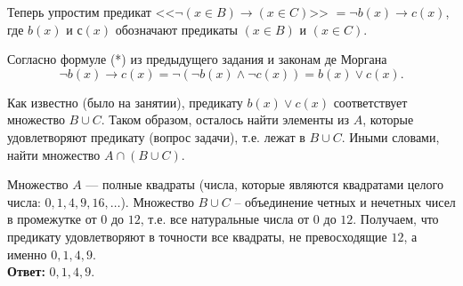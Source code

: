 \documentclass[a4paper,12pt]{article}
\begin{document}
Теперь упростим предикат <<$\neg (x \in B) \rightarrow (x \in C)$>> $=\neg b(x)\rightarrow c(x)$, где $b(x)$ и $с(x)$ обозначают предикаты $(x \in B)$ и $(x \in C)$.

Согласно формуле (*) из предыдущего задания и законам де Моргана $$\neg b(x)\rightarrow c(x)=\neg \left(\neg b(x) \wedge \neg c(x)\right)= b(x) \vee  c(x).$$

Как известно (было на занятии), предикату $b(x) \vee  c(x)$ соответствует множество $B\cup C$. Таком образом, осталось найти элементы из $A$, которые удовлетворяют предикату (вопрос задачи), т.е. лежат в $B\cup C$. Иными словами, найти множество $A\cap (B\cup C)$. 

Множество $A$ --- полные квадраты (числа, которые являются квадратами целого числа: $0,1,4,9,16,\ldots $). Множество $B\cup C$ -- объединение четных и нечетных чисел в промежутке от $0$ до $12$, т.е. все натуральные числа от $0$ до $12$. Получаем, что предикату удовлетворяют в точности все квадраты, не превосходящие $12$, а именно $0,1,4,9$.\\

{\bf Ответ:} $0,1,4,9$.
\end{document}
